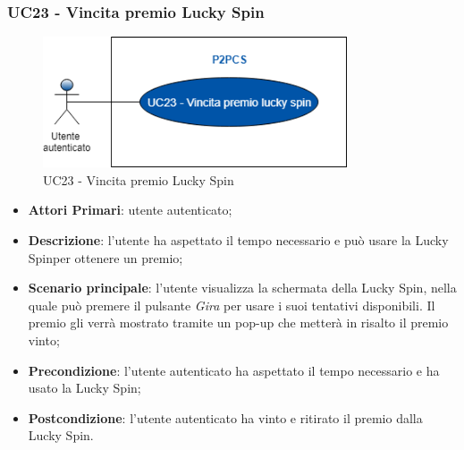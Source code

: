 \subsubsection{UC23 - Vincita premio Lucky Spin}
\begin{figure}[h]
	\includegraphics[width=9cm]{res/images/uc21.png}
	\centering
	\caption{UC23 - Vincita premio Lucky Spin}
\end{figure}
\begin{itemize}
	\item \textbf{Attori Primari}: utente autenticato;
	\item \textbf{Descrizione}: l'utente ha aspettato il tempo necessario e può usare la Lucky Spin\glosp per ottenere un premio;	
	\item \textbf{Scenario principale}: l'utente visualizza la schermata della Lucky Spin, nella quale può premere il pulsante \textit{Gira} per usare i suoi tentativi disponibili. Il premio gli verrà mostrato tramite un pop-up che metterà in risalto il premio vinto;
	\item \textbf{Precondizione}: l'utente autenticato ha aspettato il tempo necessario e ha usato la Lucky Spin;
	\item \textbf{Postcondizione}: l'utente autenticato ha vinto e ritirato il premio dalla Lucky Spin.
\end{itemize}
